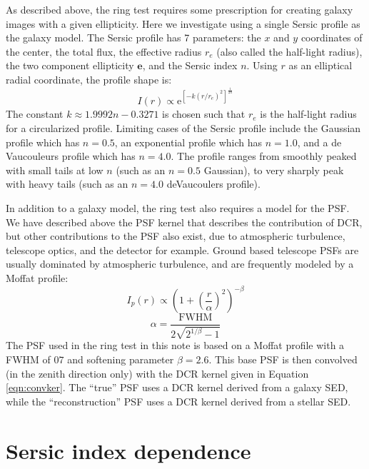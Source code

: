\documentclass[apj]{emulateapj}
\begin{document}
As described above, the ring test requires some prescription for
creating galaxy images with a given ellipticity.  Here we investigate
using a single Sersic profile as the galaxy model.  The Sersic profile
has 7 parameters: the $x$ and $y$ coordinates of the center, the total
flux, the effective radius $r_e$ (also called the half-light radius),
the two component ellipticity $\mathbf{e}$, and the Sersic index $n$.
Using $r$ as an elliptical radial coordinate, the profile shape is:
\begin{equation}
  I(r) \propto \mathrm{e}^{[-k (r/r_e)^2]^{\frac{1}{2 n}}}
\end{equation}
The constant $k \approx 1.9992 n - 0.3271$ is chosen such that $r_e$
is the half-light radius for a circularized profile.  Limiting cases
of the Sersic profile include the Gaussian profile which has $n=0.5$,
an exponential profile which has $n=1.0$, and a de Vaucouleurs profile
which has $n=4.0$.  The profile ranges from smoothly peaked with small
tails at low $n$ (such as an $n=0.5$ Gaussian), to very sharply peak
with heavy tails (such as an $n=4.0$ deVaucoulers profile).

In addition to a galaxy model, the ring test also requires a model for
the PSF.  We have described above the PSF kernel that describes the
contribution of DCR, but other contributions to the PSF also exist,
due to atmospheric turbulence, telescope optics, and the detector for
example.  Ground based telescope PSFs are usually dominated by
atmospheric turbulence, and are frequently modeled by a Moffat
profile:
\begin{equation}
  I_p(r) \propto \left(1+\left(\frac{r}{\alpha}\right)^2\right)^{-\beta}
\end{equation}
\begin{equation}
  \alpha = \frac{\mathrm{FWHM}}{2\sqrt{2^{1/\beta}-1}}
\end{equation}
The PSF used in the ring test in this note is based on a Moffat
profile with a FWHM of $0$\farcs$7$ and softening parameter $\beta =
2.6$.  This base PSF is then convolved (in the zenith direction only)
with the DCR kernel given in Equation \ref{eqn:convker}.  The ``true''
PSF uses a DCR kernel derived from a galaxy SED, while the
``reconstruction'' PSF uses a DCR kernel derived from a stellar SED.

\section{Sersic index dependence}\label{sec:sersic}
\end{document}
